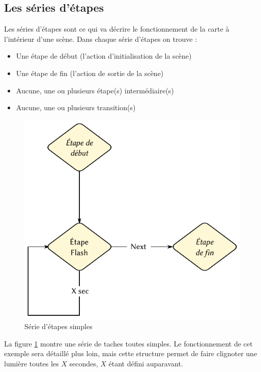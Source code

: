 \subsection{Les séries d'étapes}
Les séries d'étapes sont ce qui va décrire le fonctionnement de la carte à l'intérieur d'une scène. Dans chaque série d'étapes on trouve :
\begin{itemize}
\item Une étape de début (l'action d'initialisation de la scène)
\item Une étape de fin (l'action de sortie de la scène)
\item Aucune, une ou plusieurs étape(s) intermédiaire(s)
\item Aucune, une ou plusieurs transition(s)
\end{itemize}
\begin{figure}[htbp]
  \centering
  \includegraphics[width=.55\textwidth]{figs/etapes_simples.pdf}
  \caption{Série d'étapes simples}
  \label{fig:serie_etape_simple}
\end{figure}
La figure \ref{fig:serie_etape_simple} montre une série de taches toutes simples. Le fonctionnement de cet exemple sera détaillé plus loin, mais cette structure permet de faire clignoter une lumière toutes les $X$ secondes, $X$ étant défini auparavant.

